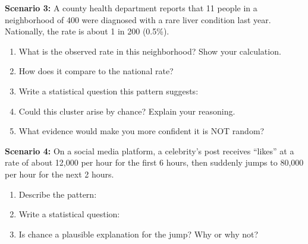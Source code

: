 \documentclass[10pt]{article}
\begin{document}
\vspace{0.1in}

\begin{tcolorbox}[colback=greenbg, colframe=greenacc, boxrule=1pt, arc=2mm,
    left=4mm, right=4mm, top=3mm, bottom=3mm,
    title={\bfseries Tier A \enspace Approaching Proficiency --- Patterns and Statistical Questions}]
\small

\textbf{Scenario 3:} A county health department reports that 11 people in a
neighborhood of 400 were diagnosed with a rare liver condition last year. Nationally,
the rate is about 1 in 200 (0.5\%).

\begin{enumerate}[leftmargin=1.5em, itemsep=8pt]
  \item What is the observed rate in this neighborhood? Show your calculation.
        \vspace{14pt}
  \item How does it compare to the national rate? \writeline
  \item Write a statistical question this pattern suggests: \writeline\writeline
  \item Could this cluster arise by chance? Explain your reasoning.\\
        \writeline\writeline
  \item What evidence would make you more confident it is NOT random?\\
        \writeline\writeline
\end{enumerate}

\vspace{8pt}
\textbf{Scenario 4:} On a social media platform, a celebrity's post receives ``likes''
at a rate of about 12{,}000 per hour for the first 6 hours, then suddenly jumps to
80{,}000 per hour for the next 2 hours.

\begin{enumerate}[leftmargin=1.5em, itemsep=8pt]
  \item Describe the pattern: \writeline
  \item Write a statistical question: \writeline\writeline
  \item Is chance a plausible explanation for the jump? Why or why not?\\
        \writeline\writeline
\end{enumerate}

\end{tcolorbox}
\end{document}
